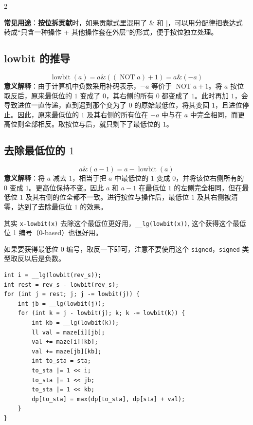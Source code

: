 \begin{multicols*}{2}

		\textbf{常见用途}：\textbf{按位拆贡献}时，如果贡献式里混用了 $\mathbin{\&}$ 和 $\mathbin{|}$，可以用分配律把表达式转成“只含一种操作 + 其他操作套在外层”的形式，便于按位独立处理。

		\subsection{lowbit 的推导}
		$$\operatorname{lowbit}(a) = a \mathbin{\&} ((\operatorname{NOT} a) + 1) = a \mathbin{\&} (-a)$$
		\textbf{意义解释}：由于计算机中负数采用补码表示，$-a$ 等价于 $\operatorname{NOT} a + 1$。将 $a$ 按位取反后，原来最低位的 $1$ 变成了 $0$，其右侧的所有 $0$ 都变成了 $1$。此时再加 $1$，会导致进位一直传递，直到遇到那个变为了 $0$ 的原始最低位，将其变回 $1$，且进位停止。因此，原来最低位的 $1$ 及其右侧的所有位在 $-a$ 中与在 $a$ 中完全相同，而更高位则全部相反。取按位与后，就只剩下了最低位的 $1$。

		\subsection[\tochl{去除最低位的 $1$}]{去除最低位的 $1$}
		$$a \mathbin{\&} (a - 1) = a - \operatorname{lowbit}(a)$$
		\textbf{意义解释}：将 $a$ 减去 $1$，相当于把 $a$ 中最低位的 $1$ 变成 $0$，并将该位右侧所有的 $0$ 变成 $1$。更高位保持不变。因此 $a$ 和 $a - 1$ 在最低位 $1$ 的左侧完全相同，但在最低位 $1$ 及其右侧的位全都不一致。进行按位与操作后，最低位 $1$ 及其右侧被清零，达到了去除最低位 $1$ 的效果。

		其实 \texttt{x-lowbit(x)} 去除这个最低位更好用，\texttt{\_\_lg(lowbit(x))}, 这个获得这个最低位 1 编号（0-based）也很好用。

		如果要获得最低位 0 编号，取反一下即可，注意不要使用这个 \texttt{signed}，\texttt{signed} 类型取反以后是负数。
		\begin{verbatim}
int i = __lg(lowbit(rev_s));
int rest = rev_s - lowbit(rev_s);
for (int j = rest; j; j -= lowbit(j)) {
	int jb = __lg(lowbit(j));
	for (int k = j - lowbit(j); k; k -= lowbit(k)) {
		int kb = __lg(lowbit(k));
		ll val = maze[i][jb];
		val += maze[i][kb];
		val += maze[jb][kb];
		int to_sta = sta;
		to_sta |= 1 << i;
		to_sta |= 1 << jb;
		to_sta |= 1 << kb;
		dp[to_sta] = max(dp[to_sta], dp[sta] + val);
	}
}
		\end{verbatim}


\end{multicols*}
